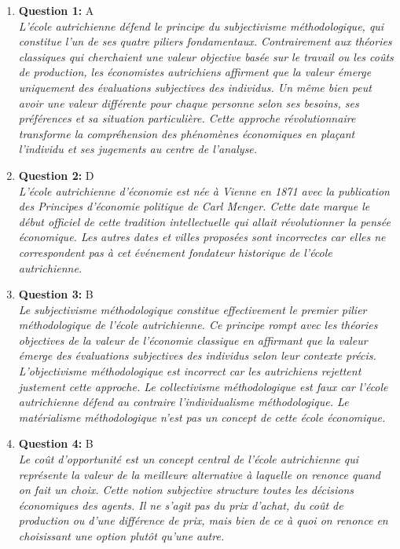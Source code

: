 \documentclass[12pt,a4paper]{article}
\begin{document}
\begin{enumerate}
\item \textbf{Question 1:} A
\\ \textit{L'école autrichienne défend le principe du subjectivisme méthodologique, qui constitue l'un de ses quatre piliers fondamentaux. Contrairement aux théories classiques qui cherchaient une valeur objective basée sur le travail ou les coûts de production, les économistes autrichiens affirment que la valeur émerge uniquement des évaluations subjectives des individus. Un même bien peut avoir une valeur différente pour chaque personne selon ses besoins, ses préférences et sa situation particulière. Cette approche révolutionnaire transforme la compréhension des phénomènes économiques en plaçant l'individu et ses jugements au centre de l'analyse.}

\item \textbf{Question 2:} D
\\ \textit{L'école autrichienne d'économie est née à Vienne en 1871 avec la publication des Principes d'économie politique de Carl Menger. Cette date marque le début officiel de cette tradition intellectuelle qui allait révolutionner la pensée économique. Les autres dates et villes proposées sont incorrectes car elles ne correspondent pas à cet événement fondateur historique de l'école autrichienne.}

\item \textbf{Question 3:} B
\\ \textit{Le subjectivisme méthodologique constitue effectivement le premier pilier méthodologique de l'école autrichienne. Ce principe rompt avec les théories objectives de la valeur de l'économie classique en affirmant que la valeur émerge des évaluations subjectives des individus selon leur contexte précis. L'objectivisme méthodologique est incorrect car les autrichiens rejettent justement cette approche. Le collectivisme méthodologique est faux car l'école autrichienne défend au contraire l'individualisme méthodologique. Le matérialisme méthodologique n'est pas un concept de cette école économique.}

\item \textbf{Question 4:} B
\\ \textit{Le coût d'opportunité est un concept central de l'école autrichienne qui représente la valeur de la meilleure alternative à laquelle on renonce quand on fait un choix. Cette notion subjective structure toutes les décisions économiques des agents. Il ne s'agit pas du prix d'achat, du coût de production ou d'une différence de prix, mais bien de ce à quoi on renonce en choisissant une option plutôt qu'une autre.}


\end{enumerate}
\end{document}
